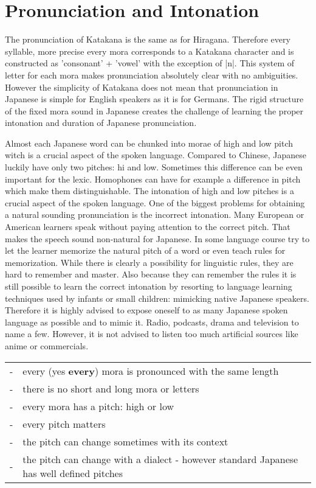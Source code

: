 \section{Pronunciation and Intonation}

The pronunciation of Katakana is the same as for Hiragana. Therefore every
syllable, more precise every mora corresponds to a Katakana character and is
constructed as 'consonant' + 'vowel' with the exception of |n|. This system of
letter for each mora makes pronunciation absolutely clear with no ambiguities.
However the simplicity of Katakana does not mean that pronunciation in Japanese
is simple for English speakers as it is for Germans.  The rigid structure of
the fixed mora sound in Japanese creates the challenge of learning the proper
intonation and duration of Japanese pronunciation.

Almost each Japanese word can be chunked into morae of high and low pitch witch
is a crucial aspect of the spoken language. Compared to Chinese, Japanese
luckily have only two pitches: hi and low. Sometimes this difference can be
even important for the lexic. Homophones can have for example a difference in
pitch which make them distinguishable.  The intonation of high and low pitches
is a crucial aspect of the spoken language. One of the biggest problems for
obtaining a natural sounding pronunciation is the incorrect intonation. Many
European or American learners speak without paying attention to the correct
pitch. That makes the speech sound non-natural for Japanese. In some language
course try to let the learner memorize the natural pitch of a word or even
teach rules for memorization. While there is clearly a possibility for
linguistic rules, they are hard to remember and master. Also because they can
remember the rules it is still possible to learn the correct intonation by
resorting to language learning techniques used by infants or small children:
mimicking native Japanese speakers. Therefore it is highly advised to expose
oneself to as many Japanese spoken language as possible and to mimic it. Radio,
podcasts, drama and television to name a few. However, it is not advised to
listen too much artificial sources like anime or commercials.

\bigskip
\begin{tabular}{rl}
-&every (yes \textbf{every}) mora is pronounced with the same length\\
-&there is no short and long mora or letters\\
-&every mora has a pitch: high or low\\
-&every pitch matters\\
-&the pitch can change  sometimes with its context\\
-&the pitch can change with a dialect - however standard Japanese has well defined pitches\\
\end{tabular}

